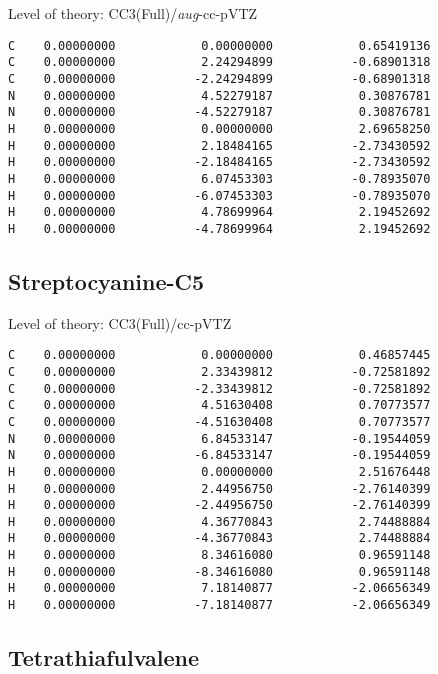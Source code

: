 \documentclass[journal=jctcce,manuscript=article,layout=traditional]{achemso}
\newcommand{\TZ}{cc-pVTZ}
\newcommand{\AVTZ}{\emph{aug}-cc-pVTZ}
\begin{document}
\begin{singlespace}
Level of theory: CC3(Full)/{\AVTZ}
\begin{verbatim}
C    0.00000000            0.00000000            0.65419136   
C    0.00000000            2.24294899           -0.68901318
C    0.00000000           -2.24294899           -0.68901318
N    0.00000000            4.52279187            0.30876781
N    0.00000000           -4.52279187            0.30876781
H    0.00000000            0.00000000            2.69658250
H    0.00000000            2.18484165           -2.73430592
H    0.00000000           -2.18484165           -2.73430592
H    0.00000000            6.07453303           -0.78935070
H    0.00000000           -6.07453303           -0.78935070
H    0.00000000            4.78699964            2.19452692
H    0.00000000           -4.78699964            2.19452692
\end{verbatim}
\end{singlespace}

\subsection*{Streptocyanine-C5}

\begin{singlespace}
Level of theory: CC3(Full)/{\TZ}
\begin{verbatim}
C    0.00000000            0.00000000            0.46857445
C    0.00000000            2.33439812           -0.72581892
C    0.00000000           -2.33439812           -0.72581892
C    0.00000000            4.51630408            0.70773577
C    0.00000000           -4.51630408            0.70773577
N    0.00000000            6.84533147           -0.19544059
N    0.00000000           -6.84533147           -0.19544059
H    0.00000000            0.00000000            2.51676448
H    0.00000000            2.44956750           -2.76140399
H    0.00000000           -2.44956750           -2.76140399
H    0.00000000            4.36770843            2.74488884
H    0.00000000           -4.36770843            2.74488884
H    0.00000000            8.34616080            0.96591148
H    0.00000000           -8.34616080            0.96591148
H    0.00000000            7.18140877           -2.06656349
H    0.00000000           -7.18140877           -2.06656349
\end{verbatim}
\end{singlespace}

\subsection*{Tetrathiafulvalene}
\end{document}
